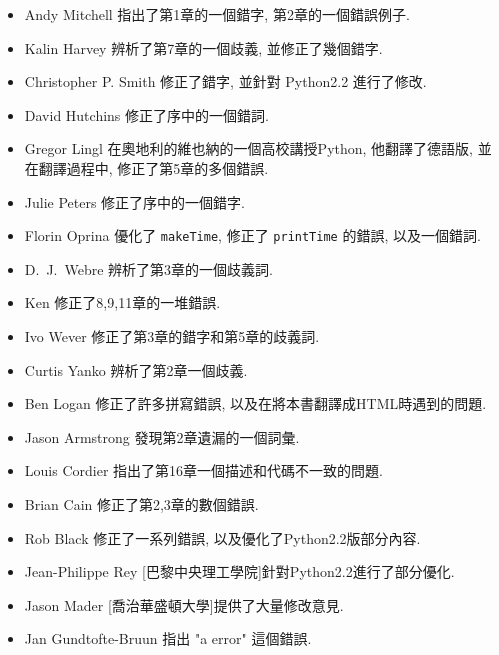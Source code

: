 \documentclass[10pt]{book}
\begin{document}
\begin{itemize}
\item Andy Mitchell 指出了第1章的一個錯字, 第2章的一個錯誤例子. 

\item Kalin Harvey 辨析了第7章的一個歧義, 並修正了幾個錯字. 

\item Christopher P. Smith 修正了錯字, 並針對 Python2.2 進行了修改. 

\item David Hutchins 修正了序中的一個錯詞. 

\item Gregor Lingl 在奧地利的維也納的一個高校講授Python, 他翻譯了德語版, 並在翻譯過程中, 修正了第5章的多個錯誤. 

\item Julie Peters 修正了序中的一個錯字. 

\item Florin Oprina 優化了 {\tt makeTime}, 修正了 {\tt printTime} 的錯誤, 以及一個錯詞. 

\item D.~J.~Webre 辨析了第3章的一個歧義詞. 

\item Ken 修正了8,9,11章的一堆錯誤. 

\item Ivo Wever 修正了第3章的錯字和第5章的歧義詞. 

\item Curtis Yanko 辨析了第2章一個歧義. 

\item Ben Logan 修正了許多拼寫錯誤, 
以及在將本書翻譯成HTML時遇到的問題. 

\item Jason Armstrong 發現第2章遺漏的一個詞彙. 

\item Louis Cordier 指出了第16章一個描述和代碼不一致的問題. 

\item Brian Cain 修正了第2,3章的數個錯誤. 

\item Rob Black 修正了一系列錯誤, 以及優化了Python2.2版部分內容. 

\item Jean-Philippe Rey [巴黎中央理工學院]針對Python2.2進行了部分優化. 

\item Jason Mader [喬治華盛頓大學]提供了大量修改意見. 

\item Jan Gundtofte-Bruun 指出 "a error" 這個錯誤. 


\end{itemize}
\end{document}
